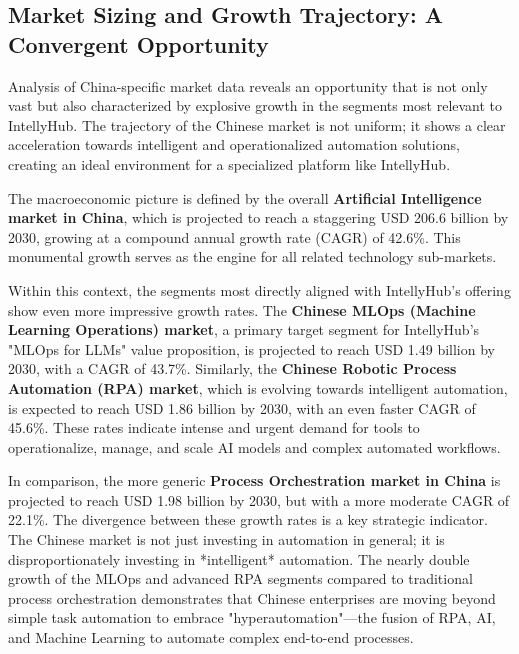 \documentclass[11pt, a4paper, oneside]{article}
\begin{document}
\subsection{Market Sizing and Growth Trajectory: A Convergent Opportunity}
Analysis of China-specific market data reveals an opportunity that is not only vast but also characterized by explosive growth in the segments most relevant to IntellyHub. The trajectory of the Chinese market is not uniform; it shows a clear acceleration towards intelligent and operationalized automation solutions, creating an ideal environment for a specialized platform like IntellyHub.

The macroeconomic picture is defined by the overall \textbf{Artificial Intelligence market in China}, which is projected to reach a staggering USD 206.6 billion by 2030, growing at a compound annual growth rate (CAGR) of 42.6\%\cite{ChinaAIMarket}. This monumental growth serves as the engine for all related technology sub-markets.

Within this context, the segments most directly aligned with IntellyHub's offering show even more impressive growth rates. The \textbf{Chinese MLOps (Machine Learning Operations) market}, a primary target segment for IntellyHub's "MLOps for LLMs" value proposition\cite{IntellyHubBP}, is projected to reach USD 1.49 billion by 2030, with a CAGR of 43.7\%\cite{ChinaMLOpsMarket}. Similarly, the \textbf{Chinese Robotic Process Automation (RPA) market}, which is evolving towards intelligent automation, is expected to reach USD 1.86 billion by 2030, with an even faster CAGR of 45.6\%\cite{ChinaRPAMarket}. These rates indicate intense and urgent demand for tools to operationalize, manage, and scale AI models and complex automated workflows.

In comparison, the more generic \textbf{Process Orchestration market in China} is projected to reach USD 1.98 billion by 2030, but with a more moderate CAGR of 22.1\%\cite{ChinaProcessOrchMarket}. The divergence between these growth rates is a key strategic indicator. The Chinese market is not just investing in automation in general; it is disproportionately investing in *intelligent* automation. The nearly double growth of the MLOps and advanced RPA segments compared to traditional process orchestration demonstrates that Chinese enterprises are moving beyond simple task automation to embrace "hyperautomation"—the fusion of RPA, AI, and Machine Learning to automate complex end-to-end processes\cite{HyperAutomationShift, HyperAutomationTrends}.
\end{document}
